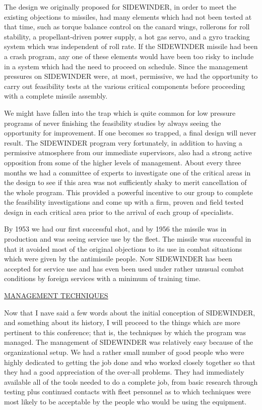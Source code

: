 \documentclass{memoir}
\begin{document}
The design we originally proposed for SIDEWINDER, in order to meet the existing objections to missiles, had many elements which had not been tested at that time, such as torque balance control on the canard wings, rollerons for roll stability, a propellant-driven power supply, a hot gas servo, and a gyro tracking system which was independent of roll rate. If the SIDEWINDER missile had been a crash program, any one of these elements would have been too risky to include in a system which had the need to proceed on schedule. Since the management pressures on SIDEWINDER were, at most, permissive, we had the opportunity to carry out feasibility tests at the various critical components before proceeding with a complete missile assembly.

We might have fallen into the trap which is quite common for low pressure programs of never finishing the feasibility studies by always seeing the opportunity for improvement. If one becomes so trapped, a final design will never result. The SIDEWINDER program very fortunately, in addition to having a permissive atmosphere from our immediate supervisors, also had a strong active opposition from some of the higher levels of management. About every three months we had a committee of experts to investigate one of the critical areas in the design to see if this area was not sufficiently shaky to merit cancellation of the whole program. This provided a powerful incentive to our group to complete the feasibility investigations and come up with a firm, proven and field tested design in each critical area prior to the arrival of each group of specialists.

By 1953 we had our first successful shot, and by 1956 the missile was in production and was seeing service use by the fleet. The missile was successful in that it avoided most of the original objections to its use in combat situations which were given by the antimissile people. Now SIDEWINDER has been accepted for service use and has even been used under rather unusual combat conditions by foreign services with a minimum of training time.

\underline{MANAGEMENT TECHNIQUES}

Now that I nave said a few words about the initial conception of SIDEWINDER, and something about its history, I will proceed to the things which are more pertinent to this conference; that is, the techniques by which the program was managed. The management of SIDEWINDER was relatively easy because of the organizational setup. We had a rather small number of good people who were highly dedicated to getting the job done and who worked closely together so that they had a good appreciation of the over-all problems. They had immediately available all of the tools needed to do a complete job, from basic research through testing plus continued contacts with fleet personnel as to which techniques were most likely to be acceptable by the people who would be using the equipment.
\end{document}

